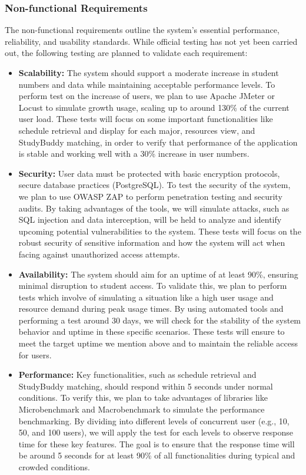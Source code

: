 \documentclass[12pt]{article}
\begin{document}
\pagebreak

\subsubsection{Non-functional Requirements}
The non-functional requirements outline the system's essential performance, reliability, and usability standards. While official testing has not yet been carried out, the following testing are planned to validate each requirement:
\begin{itemize}
    \item \textbf{Scalability:} The system should support a moderate increase in student numbers and data while maintaining acceptable performance levels. 
    To perform test on the increase of users, we plan to use Apache JMeter or Locust to simulate growth usage, scaling up to around 130\% of the current user load. 
    These tests will focus on some important functionalities like schedule retrieval and display for each major, resources view, and StudyBuddy matching, in order to verify that performance of the application is stable and working well with a 30\% increase in user numbers.

    \item \textbf{Security:} User data must be protected with basic encryption protocols, secure database practices (PostgreSQL). 
    To test the security of the system, we plan to use OWASP ZAP to perform penetration testing and security audits. 
    By taking advantages of the tools, we will simulate attacks, such as SQL injection and data interception, will be held to analyze and identify upcoming potential vulnerabilities to the system.
    These tests will focus on the robust security of sensitive information and how the system will act when facing against unauthorized access attempts.

    \item \textbf{Availability:} The system should aim for an uptime of at least 90\%, ensuring minimal disruption to student access. 
    To validate this, we plan to perform tests which involve of simulating a situation like a high user usage and resource demand during peak usage times.
    By using automated tools and performing a test around 30 days, we will check for the stability of the system behavior and uptime in these specific scenarios.
    These tests will ensure to meet the target uptime we mention above and to maintain the reliable access for users.

    \item \textbf{Performance:} Key functionalities, such as schedule retrieval and StudyBuddy matching, should respond within 5 seconds under normal conditions. 
    To verify this, we plan to take advantages of libraries like Microbenchmark and Macrobenchmark to simulate the performance benchmarking. 
    By dividing into different levels of concurrent user (e.g., 10, 50, and 100 users), we will apply the test for each levels to observe response time for these key features.
    The goal is to ensure that the response time will be around 5 seconds for at least 90\% of all functionalities during typical and crowded conditions.


\end{itemize}
\end{document}
